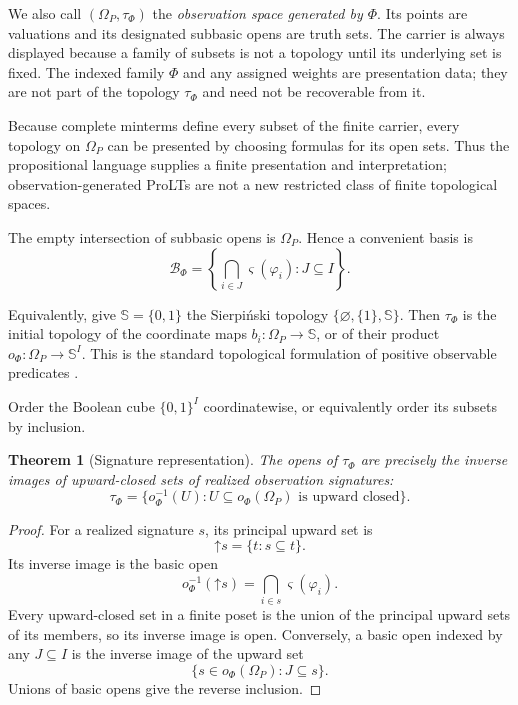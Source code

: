 \documentclass[11pt]{article}
\theoremstyle{definition}
\theoremstyle{plain}
\newtheorem{theorem}[definition]{Theorem}
\theoremstyle{remark}
\begin{document}
We also call $(\Omega_P,\tau_\Phi)$ the \emph{observation space generated by
$\Phi$}.  Its points are valuations and its designated subbasic opens are truth
sets.  The carrier is always displayed because a family of subsets is not a
topology until its underlying set is fixed.  The indexed family $\Phi$ and any
assigned weights are presentation data; they are not part of the topology
$\tau_\Phi$ and need not be recoverable from it.

Because complete minterms define every subset of the finite carrier, every
topology on $\Omega_P$ can be presented by choosing formulas for its open sets.
Thus the propositional language supplies a finite presentation and
interpretation; observation-generated ProLTs are not a new restricted class of
finite topological spaces.

The empty intersection of subbasic opens is $\Omega_P$.  Hence a convenient
basis is
\[
  \mathcal B_\Phi
  =\left\{
    \bigcap_{i\in J}\varsigma(\varphi_i):J\subseteq I
   \right\}.
\]

Equivalently, give $\mathbb S=\{0,1\}$ the Sierpi\'nski topology
$\{\varnothing,\{1\},\mathbb S\}$.  Then $\tau_\Phi$ is the initial topology of
the coordinate maps $b_i:\Omega_P\to\mathbb S$, or of their product
$o_\Phi:\Omega_P\to\mathbb S^I$.  This is the standard topological formulation
of positive observable predicates \cite[Example~1.12(3)]{Vickers2007}.

Order the Boolean cube $\{0,1\}^I$ coordinatewise, or equivalently order its
subsets by inclusion.

\begin{theorem}[Signature representation]
The opens of $\tau_\Phi$ are precisely the inverse images of upward-closed sets of
realized observation signatures:
\[
  \tau_\Phi
  =\{o_\Phi^{-1}(U):U\subseteq o_\Phi(\Omega_P)
       \text{ is upward closed}\}.
\]
\end{theorem}

\begin{proof}
For a realized signature $s$, its principal upward set is
\[
  \mathord\uparrow s
  =\{t:s\subseteq t\}.
\]
Its inverse image is the basic open
\[
  o_\Phi^{-1}(\mathord\uparrow s)
  =\bigcap_{i\in s}\varsigma(\varphi_i).
\]
Every upward-closed set in a finite poset is the union of the principal upward
sets of its members, so its inverse image is open.  Conversely, a basic open
indexed by any $J\subseteq I$ is the inverse image of the upward set
\[
 \{s\in o_\Phi(\Omega_P):J\subseteq s\}.
\]
Unions of basic opens give the reverse inclusion.
\end{proof}
\end{document}
